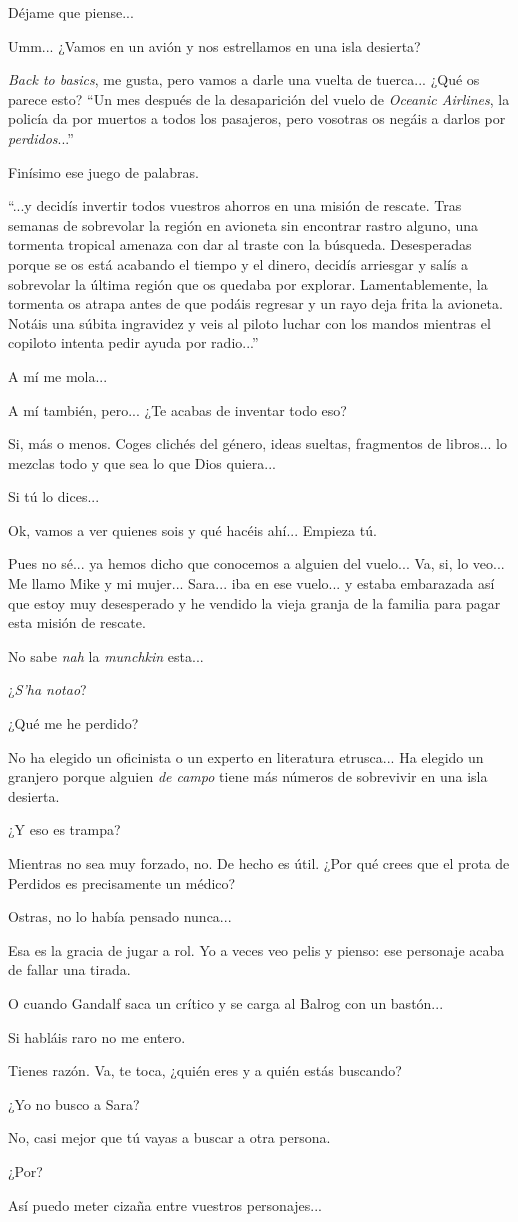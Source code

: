 \documentclass[10pt, a5paper, twocolumn]{article}
\newcommand\E{\item[\raisebox{-0.25em}{\scalebox{0.75}{\bcicosaedre}}]}
\newcommand\B{\item[\raisebox{-0.25em}{\scalebox{0.75}{\bccube}}]}
\newcommand\A{\item[\raisebox{-0.25em}{\scalebox{0.75}{\bctetraedre}}]}
\newenvironment{dialogue}
    {\begin{description}[leftmargin=!,align=right,labelwidth=0.cm]}
    {\end{description}}
\begin{document}
\begin{dialogue}
        \B Déjame que piense...
        \A Umm... ¿Vamos en un avión y nos estrellamos en una isla desierta?
        \E \emph{Back to basics}, me gusta, pero vamos a darle una vuelta de tuerca... ¿Qué os parece esto? ``Un mes después de la desaparición del vuelo de \emph{Oceanic Airlines}, la policía da por muertos a todos los pasajeros, pero vosotras os negáis a darlos por \emph{perdidos}...''
        \B Finísimo ese juego de palabras.
        \E ``...y decidís invertir todos vuestros ahorros en una misión de rescate. Tras semanas de sobrevolar la región en avioneta sin encontrar rastro alguno, una tormenta tropical amenaza con dar al traste con la búsqueda. Desesperadas porque se os está acabando el tiempo y el dinero, decidís arriesgar y salís a sobrevolar la última región que os quedaba por explorar. Lamentablemente, la tormenta os atrapa antes de que podáis regresar y un rayo deja frita la avioneta. Notáis una súbita ingravidez y veis al piloto luchar con los mandos mientras el copiloto intenta pedir ayuda por radio...''
        \B A mí me mola...
        \A A mí también, pero... ¿Te acabas de inventar todo eso?
        \E Si, más o menos. Coges clichés del género, ideas sueltas, fragmentos de libros... lo mezclas todo y que sea lo que Dios quiera...
        \A Si tú lo dices...
        \E Ok, vamos a ver quienes sois y qué hacéis ahí... Empieza tú.
        \B Pues no sé... ya hemos dicho que conocemos a alguien del vuelo... Va, si, lo veo... Me llamo Mike y mi mujer... Sara... iba en ese vuelo... y estaba embarazada así que estoy muy desesperado y he vendido la vieja granja de la familia para pagar esta misión de rescate.
        \E No sabe \emph{nah} la \emph{munchkin} esta...
        \B ¿\emph{S'ha notao}?
        \A ¿Qué me he perdido?
        \E No ha elegido un oficinista o un experto en literatura etrusca... Ha elegido un granjero porque alguien \emph{de campo} tiene más números de sobrevivir en una isla desierta.
        \A ¿Y eso es trampa?
        \E Mientras no sea muy forzado, no. De hecho es útil. ¿Por qué crees que el prota de Perdidos es precisamente un médico?
        \A Ostras, no lo había pensado nunca...
        \B Esa es la gracia de jugar a rol. Yo a veces veo pelis y pienso: ese personaje acaba de fallar una tirada.
        \E O cuando Gandalf saca un crítico y se carga al Balrog con un bastón...
        \A Si habláis raro no me entero.
        \E Tienes razón. Va, te toca, ¿quién eres y a quién estás buscando?
        \A ¿Yo no busco a Sara?
        \E No, casi mejor que tú vayas a buscar a otra persona.
        \A ¿Por?
        \E Así puedo meter cizaña entre vuestros personajes...

\end{dialogue}
\end{document}
